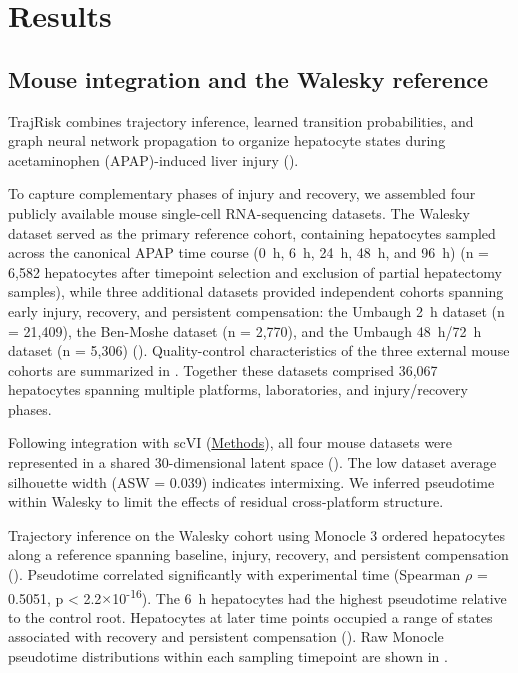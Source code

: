 \section*{Results}

\subsection*{Mouse integration and the Walesky reference}

TrajRisk combines trajectory inference, learned transition probabilities, and graph neural network propagation to organize hepatocyte states during acetaminophen (APAP)-induced liver injury ().

To capture complementary phases of injury and recovery, we assembled four publicly available mouse single-cell RNA-sequencing datasets. The Walesky dataset served as the primary reference cohort, containing hepatocytes sampled across the canonical APAP time course (0~h, 6~h, 24~h, 48~h, and 96~h) (n = 6,582 hepatocytes after timepoint selection and exclusion of partial hepatectomy samples), while three additional datasets provided independent cohorts spanning early injury, recovery, and persistent compensation: the Umbaugh 2~h dataset (n = 21,409), the Ben-Moshe dataset (n = 2,770), and the Umbaugh 48~h/72~h dataset (n = 5,306) (). Quality-control characteristics of the three external mouse cohorts are summarized in . Together these datasets comprised 36,067 hepatocytes spanning multiple platforms, laboratories, and injury/recovery phases.

Following integration with scVI (\hyperref[sec:methods]{Methods}), all four mouse datasets were represented in a shared 30-dimensional latent space (). The low dataset average silhouette width (ASW = 0.039) indicates intermixing. We inferred pseudotime within Walesky to limit the effects of residual cross-platform structure.

Trajectory inference on the Walesky cohort using Monocle 3 \cite{ref047} ordered hepatocytes along a reference spanning baseline, injury, recovery, and persistent compensation (). Pseudotime correlated significantly with experimental time (Spearman \ensuremath{\rho} = 0.5051, p < 2.2\ensuremath{\times}10\textsuperscript{-16}). The 6~h hepatocytes had the highest pseudotime relative to the control root. Hepatocytes at later time points occupied a range of states associated with recovery and persistent compensation (). Raw Monocle pseudotime distributions within each sampling timepoint are shown in .

